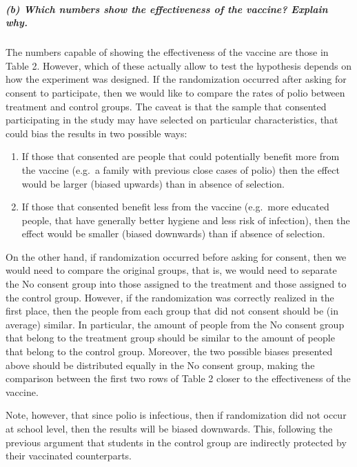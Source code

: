 \documentclass[11pt, english]{article}
\begin{document}
    \hypertarget{b-which-numbers-show-the-effectiveness-of-the-vaccine-explain-why.}{%
\subparagraph{(b) Which numbers show the effectiveness of the vaccine?
Explain
why. \\[2ex]}\label{b-which-numbers-show-the-effectiveness-of-the-vaccine-explain-why.}}

    The numbers capable of showing the effectiveness of the vaccine are
those in Table 2. However, which of these actually allow to test the
hypothesis depends on how the experiment was designed. If the
randomization occurred after asking for consent to participate, then we
would like to compare the rates of polio between treatment and control
groups. The caveat is that the sample that consented participating in
the study may have selected on particular characteristics, that could
bias the results in two possible ways:
\begin{enumerate}
\item If those that consented are people that could potentially benefit more
from the vaccine (e.g.~a family with previous close cases of polio) then
the effect would be larger (biased upwards) than in absence of
selection.

\item If those that consented benefit less from the vaccine (e.g.~more
educated people, that have generally better hygiene and less risk of
infection), then the effect would be smaller (biased downwards) than if
absence of selection.
\end{enumerate}

On the other hand, if randomization occurred before asking for consent,
then we would need to compare the original groups, that is, we would
need to separate the No consent group into those assigned to the
treatment and those assigned to the control group. However, if the
randomization was correctly realized in the first place, then the people
from each group that did not consent should be (in average) similar. In
particular, the amount of people from the No consent group that belong
to the treatment group should be similar to the amount of people that
belong to the control group. Moreover, the two possible biases presented
above should be distributed equally in the No consent group, making the
comparison between the first two rows of Table 2 closer to the
effectiveness of the vaccine.

Note, however, that since polio is infectious, then if randomization did
not occur at school level, then the results will be biased downwards.
This, following the previous argument that students in the control group
are indirectly protected by their vaccinated counterparts.
\end{document}
